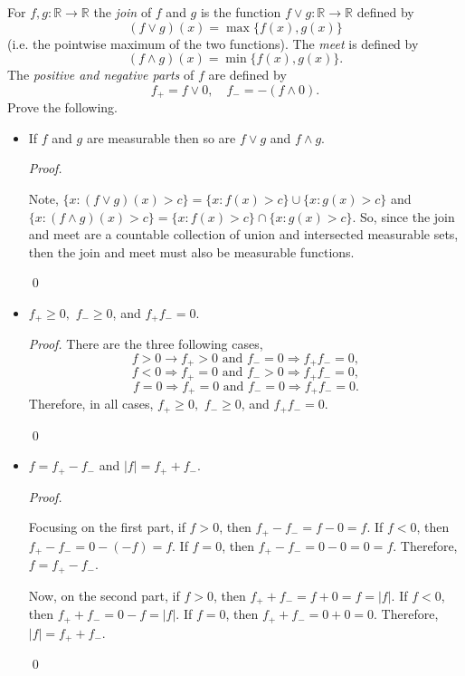 \documentclass[12pt]{article}
\newenvironment{problem}[2][Problem]{\begin{trivlist}
\item[\hskip \labelsep {\bfseries #1}\hskip \labelsep {\bfseries
#2.}]}{\end{trivlist}}
\newenvironment{sol}
    {\emph{Proof.}
    }
    {
    \qed
    }
\begin{document}
      
      \begin{problem}{48}
        For $f,g : \mathbb{R} \to \mathbb{R}$ the \textit{join} of $f$ and $g$ is the function $f \vee g : \mathbb{R} \to \mathbb{R}$ defined by $$(f \vee g)(x) = \max\{f(x),g(x)\}$$ (i.e. the pointwise maximum of the two functions). The \textit{meet} is defined by $$(f \wedge g)(x) = \min\{f(x),g(x)\}.$$ The \textit{positive and negative parts} of $f$ are defined by $$f_+ = f \vee 0, \hspace{1em} f_- = -(f \wedge 0).$$ Prove the following.
        \begin{itemize}
          \item[(i)] If $f$ and $g$ are measurable then so are $f \vee g$ and $f \wedge g$.
          
          \begin{sol}
            Note, $\{x : (f \vee g)(x) > c\} = \{x : f(x) > c\} \cup \{x : g(x) > c\}$ and $\{x : (f \wedge g)(x) > c\} = \{x : f(x) > c\} \cap \{x : g(x) > c\}$. So, since the join and meet are a countable collection of union and intersected measurable sets, then the join and meet must also be measurable functions.
          \end{sol}
      
          \item[(ii)] $f_+ \geq 0,$ $f_- \geq 0$, and $f_+f_- = 0$.
          
          \begin{sol} There are the three following cases,
            $$f > 0 \longrightarrow f_+ > 0 \text{ and } f_- = 0 \Longrightarrow f_+f_- = 0,$$
            $$f < 0 \Longrightarrow f_+ = 0 \text{ and } f_- > 0 \Longrightarrow f_+f_- = 0,$$
            $$f = 0 \Longrightarrow f_+ = 0 \text{ and } f_- = 0 \Longrightarrow f_+f_- = 0.$$
            Therefore, in all cases, $f_+ \geq 0,$ $f_- \geq 0$, and $f_+f_- = 0$.
          \end{sol}
      
          \item[(iii)] $f = f_+-f_-$ and $|f| = f_++f_-$.
          
          \begin{sol}
            Focusing on the first part, if $f > 0$, then $f_+ - f_- = f - 0 = f$. If $f < 0$, then $f_+ - f_- = 0 - (-f) = f$. If $f = 0$, then $f_+ - f_- = 0 - 0 = 0 = f$. Therefore, $f = f_+ - f_-$. 
      
            Now, on the second part, if $f > 0$, then $f_+ + f_- = f + 0 = f = |f|$. If $f < 0$, then $f_+ + f_- = 0 - f = |f|$. If $f = 0$, then $f_+ + f_- = 0 + 0 = 0$. Therefore, $|f| = f_+ + f_-$.
          \end{sol}
          

\end{itemize}
\end{problem}
\end{document}
